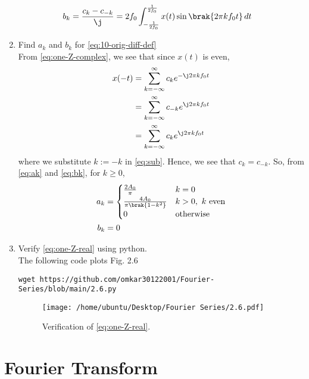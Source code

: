 \documentclass[journal,12pt,twocolumn]{IEEEtran}
\renewcommand\thesection{\arabic{section}}
\begin{document}
\begin{enumerate}[label=\thesection.\arabic*,ref=\thesection.\theenumi]
\begin{align}
	b_k &= \frac{c_k - c_{-k}}{\j} = 2f_0\int_{-\frac{1}{2f_0}}^{\frac{1}{2f_0}}
	x(t)\sin\brak{2\pi kf_0t}\, dt
	\label{eq:bk}
\end{align}
\item Find $a_k$ and $b_k$ for 
\eqref{eq:10-orig-diff-def} \\
\solution From \eqref{eq:one-Z-complex}, we see that since $x(t)$ is even,
\begin{align}
	x(-t) &= \sum_{k = -\infty}^{\infty}c_ke^{-\j2\pi kf_0 t} \\
	&= \sum_{k = -\infty}^{\infty}c_{-k}e^{\j2\pi kf_0t} \label{eq:sub} \\
	&= \sum_{k = -\infty}^{\infty}c_ke^{\j2\pi kf_0 t}
\end{align}
where we substitute $k := -k$ in \eqref{eq:sub}. Hence, we see that 
$c_k = c_{-k}$. So, from \eqref{eq:ak} and \eqref{eq:bk}, for $k \ge 0$,
\begin{align}
	a_k &= 
	\begin{cases}
		\frac{2A_0}{\pi} & k = 0 \\
		\frac{4A_0}{\pi\brak{1 - k^2}} & k > 0,\ k\ \text{even} \\
		0 & \text{otherwise}
	\end{cases} \label{eq:ak-xt}\\
	b_k &= 0
	\label{eq:bk-xt}
\end{align}
\item Verify 
\eqref{eq:one-Z-real}
using python. \\
\solution
The following code plots Fig. 2.6
\begin{lstlisting}
wget https://github.com/omkar30122001/Fourier-Series/blob/main/2.6.py
\end{lstlisting}
\begin{figure}[!ht]
	\texttt{[image: /home/ubuntu/Desktop/Fourier Series/2.6.pdf]}
	\caption{Verification of \eqref{eq:one-Z-real}.}
	\label{fig:ver-real}
\end{figure}

\end{enumerate}
\section{Fourier Transform}
\end{document}
